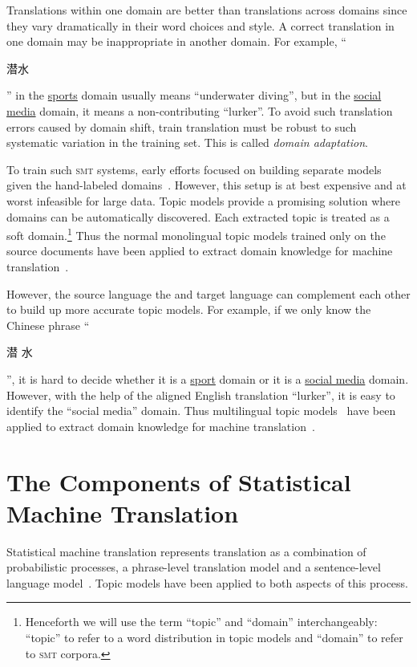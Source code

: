 Translations within one domain are better than translations across
domains since they vary dramatically in their word choices and style.
A correct translation in one domain may be inappropriate in another
domain.  For example, ``\begin{CJK*}{UTF8}{gbsn}潜水\end{CJK*}'' in the
  \underline{sports} domain usually means ``underwater diving'', but
  in the \underline{social media} domain, it means a non-contributing
  ``lurker''. To avoid such translation errors caused by domain
  shift, train translation must be robust to such systematic variation
  in the training set.  This is called \emph{domain adaptation}.

To train such \textsc{smt} systems, early
efforts focused on building separate models given the hand-labeled
domains~\citep{foster-07,matsoukas-09,chiang-11}. However, this setup
is at best expensive and at worst infeasible for large data.  Topic
models provide a promising solution where domains can be automatically
discovered. Each extracted topic is treated as a soft
domain.\footnote{Henceforth we will use the term ``topic'' and
  ``domain'' interchangeably: ``topic'' to refer to  a word distribution in
  topic models and ``domain'' to refer to \textsc{smt} corpora.} Thus
the normal monolingual topic models trained only on the source documents have
been applied to extract domain knowledge for machine
translation~\citep{Eidelman-12}.

However, the source language the and target language can complement
each other to build up more accurate topic models. For example, if we
only know the Chinese phrase ``\begin{CJK*}{UTF8}{gbsn}潜
  水\end{CJK*}'', it is hard to decide whether it is a
  \underline{sport} domain or it is a \underline{social media}
  domain. However, with the help of the aligned English translation
  ``lurker'', it is easy to identify the ``social media'' domain. Thus
  multilingual topic models~\citep{ni-09,DeSmet-09} have been
  applied to extract domain knowledge for machine
  translation~\citep{hu-14}.

\section{The Components of Statistical Machine Translation}

Statistical machine translation represents translation as a
combination of probabilistic processes, a phrase-level translation model and a sentence-level language model~\citep{koehn-03,koehn-09}. 
Topic models have been applied to both aspects of this process.

